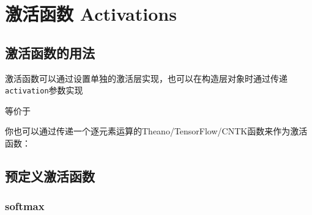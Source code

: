\section{激活函数 Activations}\label{activations}
\subsection{激活函数的用法}

激活函数可以通过设置单独的激活层实现，也可以在构造层对象时通过传递\texttt{activation}参数实现

\begin{Shaded}
\begin{Highlighting}[]
  

\NormalTok{))}
\NormalTok{))}
\end{Highlighting}
\end{Shaded}

等价于

\begin{Shaded}
\begin{Highlighting}[]
\OperatorTok{=}\NormalTok{))}
\end{Highlighting}
\end{Shaded}

你也可以通过传递一个逐元素运算的Theano/TensorFlow/CNTK函数来作为激活函数：

\begin{Shaded}
\begin{Highlighting}[]
   

\OperatorTok{=}
\end{Highlighting}
\end{Shaded}

\subsection{预定义激活函数}\label{ux9884ux5b9aux4e49ux6fc0ux6d3bux51fdux6570}

\subsubsection{softmax}\label{softmax}

